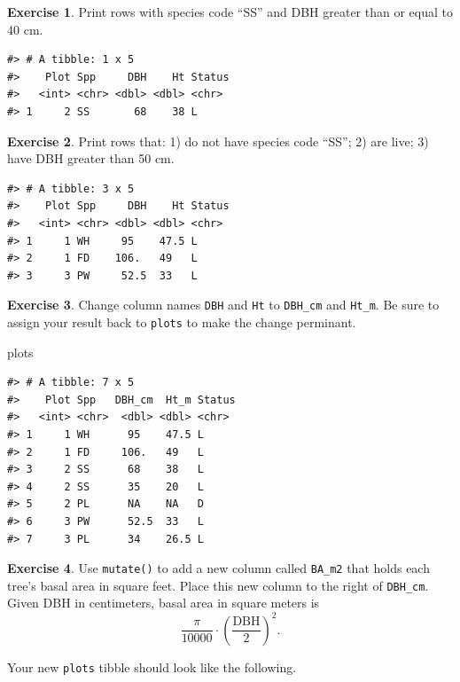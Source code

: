 \documentclass[
  11pt,
]{krantz}
\newenvironment{Shaded}{\begin{snugshade}}{\end{snugshade}}
\newcommand{\NormalTok}[1]{#1}
\theoremstyle{definition}
\theoremstyle{definition}
\theoremstyle{definition}
\newtheorem{exercise}{Exercise}[chapter]
\theoremstyle{definition}
\theoremstyle{remark}
\begin{document}
\begin{exercise}
\protect\hypertarget{exr:dplyr6}{}\label{exr:dplyr6}Print rows with species code ``SS'' and DBH greater than or equal to 40 cm.
\end{exercise}

\begin{verbatim}
#> # A tibble: 1 x 5
#>    Plot Spp     DBH    Ht Status
#>   <int> <chr> <dbl> <dbl> <chr> 
#> 1     2 SS       68    38 L
\end{verbatim}

\begin{exercise}
\protect\hypertarget{exr:dplyr7}{}\label{exr:dplyr7}Print rows that: 1) do not have species code ``SS''; 2) are live; 3) have DBH greater than 50 cm.
\end{exercise}

\begin{verbatim}
#> # A tibble: 3 x 5
#>    Plot Spp     DBH    Ht Status
#>   <int> <chr> <dbl> <dbl> <chr> 
#> 1     1 WH     95    47.5 L     
#> 2     1 FD    106.   49   L     
#> 3     3 PW     52.5  33   L
\end{verbatim}

\begin{exercise}
\protect\hypertarget{exr:dplyr8}{}\label{exr:dplyr8}Change column names \texttt{DBH} and \texttt{Ht} to \texttt{DBH\_cm} and \texttt{Ht\_m}. Be sure to assign your result back to \texttt{plots} to make the change perminant.
\end{exercise}

\begin{Shaded}
\begin{Highlighting}[]
\NormalTok{plots}
\end{Highlighting}
\end{Shaded}

\begin{verbatim}
#> # A tibble: 7 x 5
#>    Plot Spp   DBH_cm  Ht_m Status
#>   <int> <chr>  <dbl> <dbl> <chr> 
#> 1     1 WH      95    47.5 L     
#> 2     1 FD     106.   49   L     
#> 3     2 SS      68    38   L     
#> 4     2 SS      35    20   L     
#> 5     2 PL      NA    NA   D     
#> 6     3 PW      52.5  33   L     
#> 7     3 PL      34    26.5 L
\end{verbatim}

\begin{exercise}
\protect\hypertarget{exr:dplyr9}{}\label{exr:dplyr9}Use \texttt{mutate()} to add a new column called \texttt{BA\_m2} that holds each tree's basal area in square feet. Place this new column to the right of \texttt{DBH\_cm}. Given DBH in centimeters, basal area in square meters is
\begin{equation}
\frac{\pi}{10000}\cdot\left(\frac{\text{DBH}}{2}\right)^2.
\end{equation}

Your new \texttt{plots} tibble should look like the following.
\end{exercise}
\end{document}
